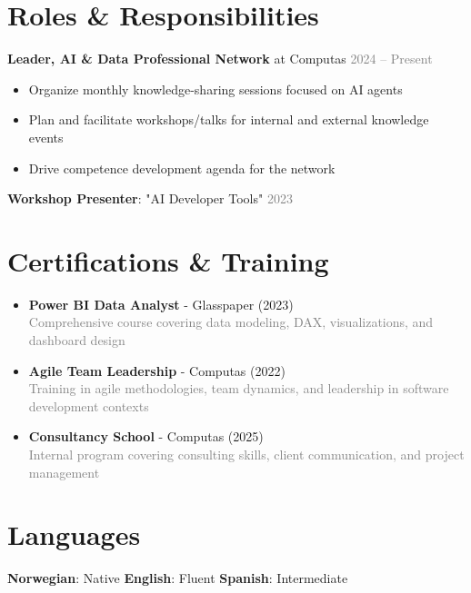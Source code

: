 \documentclass[11pt,a4paper]{article}
\begin{document}
\vspace{10pt}

\section{Roles \& Responsibilities}

\textbf{Leader, AI \& Data Professional Network} at Computas \hfill \textcolor{gray}{2024 – Present}
\begin{itemize}[itemsep=0.3em, leftmargin=*]
\item Organize monthly knowledge-sharing sessions focused on AI agents
\item Plan and facilitate workshops/talks for internal and external knowledge events
\item Drive competence development agenda for the network
\end{itemize}

\textbf{Workshop Presenter}: "AI Developer Tools" \hfill \textcolor{gray}{2023}

\vspace{10pt}

\section{Certifications \& Training}

\begin{itemize}[itemsep=0.5em, leftmargin=*]
\item \textbf{Power BI Data Analyst} - Glasspaper (2023)\\
\textcolor{gray}{Comprehensive course covering data modeling, DAX, visualizations, and dashboard design}
\item \textbf{Agile Team Leadership} - Computas (2022)\\
\textcolor{gray}{Training in agile methodologies, team dynamics, and leadership in software development contexts}
\item \textbf{Consultancy School} - Computas (2025)\\
\textcolor{gray}{Internal program covering consulting skills, client communication, and project management}
\end{itemize}

\vspace{10pt}

\section{Languages}
\textbf{Norwegian}: Native \quad \textbf{English}: Fluent \quad \textbf{Spanish}: Intermediate
\end{document}
